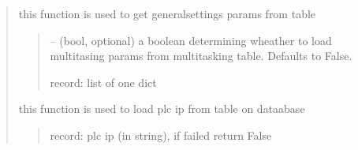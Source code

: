 \documentclass[letterpaper,10pt,english]{sphinxmanual}
\begin{document}
\begin{quote}
\begin{savenotes}
\begin{fulllineitems}
\begin{savenotes}\begin{fulllineitems}
\label{\detokenize{setting/database_utils:oxin.database_utils.dataBaseUtils.load_general_setting_params}}
\pysigstartsignatures
{}
\pysigstopsignatures
\sphinxAtStartPar
this function is used to get general\sphinxhyphen{}settings params from table
\begin{quote}\begin{description}
\sphinxAtStartPar
{} – (bool, optional) a boolean determining wheather to load multitasing params from multitasking table. Defaults to False.

\sphinxAtStartPar
record: list of one dict

\end{description}\end{quote}

\end{fulllineitems}\end{savenotes}


\begin{savenotes}\begin{fulllineitems}
\label{\detokenize{setting/database_utils:oxin.database_utils.dataBaseUtils.load_plc_ip}}
\pysigstartsignatures
{}
\pysigstopsignatures
\sphinxAtStartPar
this function is used to load plc ip from table on dataabase
\begin{quote}\begin{description}
\sphinxAtStartPar
record: plc ip (in string), if failed return False

\end{description}\end{quote}

\end{fulllineitems}\end{savenotes}



\end{fulllineitems}
\end{savenotes}
\end{quote}
\end{document}
